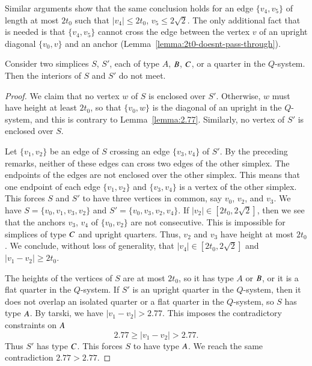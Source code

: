 Similar arguments show that the same conclusion holds for an edge
$\{v_4,v_5\}$ of length at most $2t_0$ such that $|v_4|\le2t_0$,
$v_5\le2\sqrt{2}$.  The only additional fact that is needed is
that $\{v_4,v_5\}$ cannot cross the edge between the vertex $v$ of
an upright diagonal $\{v_0,v\}$ and an anchor
(Lemma~\ref{lemma:2t0-doesnt-pass-through}).





\begin{lemma}
    \label{lemma:no-overlap}
    Consider two simplices $S$, $S'$, each of  type $A$, $B$, $C$,
or a quarter in the $Q$-system.
    Then the interiors
    of
    $S$ and $S'$ do not meet.
\end{lemma}

\begin{proof}
We claim that no vertex $w$ of $S$ is enclosed over $S'$.
Otherwise, $w$ must have height at least $2t_0$, so that $\{v_0,w\}$
is the diagonal of an upright in the $Q$-system, and this is
contrary to Lemma~\ref{lemma:2.77}. Similarly, no vertex of $S'$
is enclosed over $S$.

Let $\{v_1,v_2\}$ be an edge of $S$ crossing an edge $\{v_3,v_4\}$ of
$S'$. By the preceding remarks, neither of these edges can cross
two edges of the other simplex. The endpoints of the edges are not
enclosed over the other simplex. This means that one endpoint of
each edge $\{v_1,v_2\}$ and $\{v_3,v_4\}$ is a vertex of the other
simplex.  This forces $S$ and $S'$ to have three vertices in
common, say $v_0$, $v_2$, and $v_3$.  We have $S=\{v_0,v_1,v_3,v_2\}$
and $S'=\{v_0,v_3,v_2,v_4\}$. If
    $|v_2|\in[2t_0,2\sqrt{2}]$,
then we see that the anchors $v_3$, $v_4$ of $\{v_0,v_2\}$ are not
consecutive.  This is impossible for simplices of type $C$ and
upright quarters.  Thus, $v_2$ and $v_3$ have height at most
$2t_0$.  We conclude, without loss of generality, that
    $|v_4|\in[2t_0,2\sqrt{2}]$
and $|v_1-v_2|\ge 2t_0$.

The heights of the vertices of $S$ are at most $2t_0$, so it has
type $A$ or $B$, or it is a flat quarter in the $Q$-system. If
$S'$ is an upright quarter in the $Q$-system, then it does not
overlap an isolated quarter or a flat quarter in the $Q$-system,
so $S$ has type $A$. By tarski, we have
$|v_1-v_2|>2.77$.  This imposes the contradictory constraints
on $A$
    $$
    2.77\ge |v_1-v_2|>2.77.
    $$
Thus $S'$ has type $C$.  This forces $S$ to have type $A$.  We
reach the same contradiction  $2.77 > 2.77$.
\end{proof}

